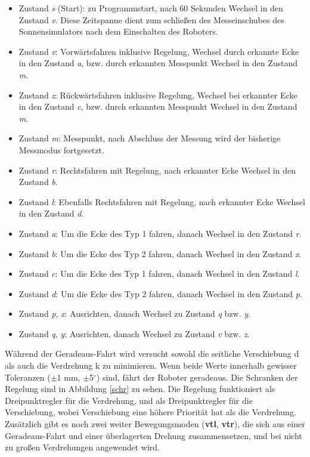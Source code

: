 \documentclass[a4paper,bibtotoc,oneside]{scrbook}
\begin{document}
\begin{itemize}
\item Zustand \textit{s} (Start): zu Programmstart, nach 60 Sekunden Wechsel in den Zustand \textit{v}. Diese Zeitspanne dient zum schließen des Messeinschubes des Sonnensimulators nach dem Einschalten des Roboters.
\item Zustand \textit{v}: Vorwärtsfahren inklusive Regelung, Wechsel durch erkannte Ecke in den Zustand \textit{a}, bzw. durch erkannten Messpunkt Wechsel in den Zustand \textit{m}.
\item Zustand \textit{z}: Rückwärtsfahren inklusive Regelung, Wechsel bei erkannter Ecke in den Zustand \textit{c}, bzw. durch erkannten Messpunkt Wechsel in den Zustand \textit{m}.
\item Zustand \textit{m}: Messpunkt, nach Abschluss der Messung wird der bisherige Messmodus fortgesetzt.
\item Zustand \textit{r}: Rechtsfahren mit Regelung, nach erkannter Ecke Wechsel in den Zustand \textit{b}.
\item Zustand \textit{l}: Ebenfalls Rechtsfahren mit Regelung, nach erkannter Ecke Wechsel in den Zustand \textit{d}.
\item Zustand \textit{a}: Um die Ecke des Typ 1 fahren, danach Wechsel in den Zustand \textit{r}. 
\item Zustand \textit{b}: Um die Ecke des Typ 2 fahren, danach Wechsel in den Zustand \textit{x}.
\item Zustand \textit{c}: Um die Ecke des Typ 1 fahren, danach Wechsel in den Zustand \textit{l}. 
\item Zustand \textit{d}: Um die Ecke des Typ 2 fahren, danach Wechsel in den Zustand \textit{p}.
\item Zustand \textit{p}, \textit{x}: Ausrichten, danach Wechsel zu Zustand \textit{q} bzw. \textit{y}.
\item Zustand \textit{q}, \textit{y}: Ausrichten, danach Wechsel zu Zustand \textit{v} bzw. \textit{z}.
\end{itemize}

\noindent Während der Geradeaus-Fahrt wird versucht sowohl die seitliche Verschiebung d als auch die Verdrehung k zu minimieren. Wenn beide Werte innerhalb gewisser Toleranzen ($\pm$1 mm, $\pm$5$^{\circ}$) sind, fährt der Roboter geradeaus. Die Schranken der Regelung sind in Abbildung \ref{schr} zu sehen. Die Regelung funktioniert als Dreipunktregler für die Verdrehung, und als Dreipunktregler für die Verschiebung, wobei Verschiebung eine höhere Priorität hat als die Verdrehung. Zusätzlich gibt es noch zwei weiter Bewegungsmoden (\textbf{vtl}, \textbf{vtr}), die sich aus einer Geradeaus-Fahrt und einer überlagerten Drehung zusammensetzen, und bei nicht zu großen Verdrehungen angewendet wird.
\end{document}
